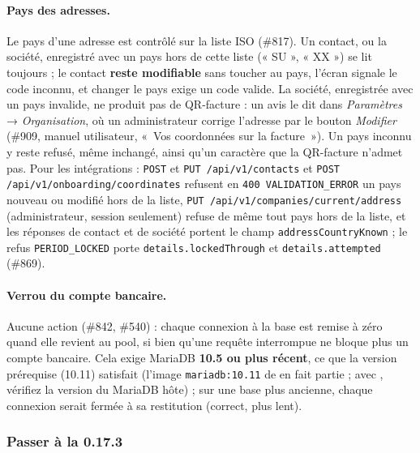 \documentclass[a4paper,11pt,oneside]{article}
\begin{document}
\begin{sloppypar}
\paragraph{Pays des adresses.} Le pays d'une adresse est contrôlé sur la liste ISO (\#817). Un contact, ou la société, enregistré avec un pays hors de cette liste (« SU », « XX ») se lit toujours ; le contact \textbf{reste modifiable} sans toucher au pays, l'écran signale le code inconnu, et changer le pays exige un code valide. La société, enregistrée avec un pays invalide, ne produit pas de QR-facture : un avis le dit dans \emph{Paramètres} → \emph{Organisation}, où un administrateur corrige l'adresse par le bouton \emph{Modifier} (\#909, manuel utilisateur, «~Vos coordonnées sur la facture~»). Un pays inconnu y reste refusé, même inchangé, ainsi qu'un caractère que la QR-facture n'admet pas. Pour les intégrations : \texttt{POST} et \texttt{PUT /api/v1/contacts} et \texttt{POST /api/v1/onboarding/coordinates} refusent en \texttt{400 VALIDATION\_ERROR} un pays nouveau ou modifié hors de la liste, \texttt{PUT /api/v1/companies/current/address} (administrateur, session seulement) refuse de même tout pays hors de la liste, et les réponses de contact et de société portent le champ \texttt{addressCountryKnown} ; le refus \texttt{PERIOD\_LOCKED} porte \texttt{details.lockedThrough} et \texttt{details.attempted} (\#869).
\end{sloppypar}

\begin{sloppypar}
\paragraph{Verrou du compte bancaire.} Aucune action (\#842, \#540) : chaque connexion à la base est remise à zéro quand elle revient au pool, si bien qu'une requête interrompue ne bloque plus un compte bancaire. Cela exige MariaDB \textbf{10.5 ou plus récent}, ce que la version prérequise (10.11) satisfait (l'image \texttt{mariadb:10.11} de  en fait partie ; avec , vérifiez la version du MariaDB hôte) ; sur une base plus ancienne, chaque connexion serait fermée à sa restitution (correct, plus lent).
\end{sloppypar}

\subsubsection{Passer à la 0.17.3}\label{sec:maj-0-17-3}
\end{document}
